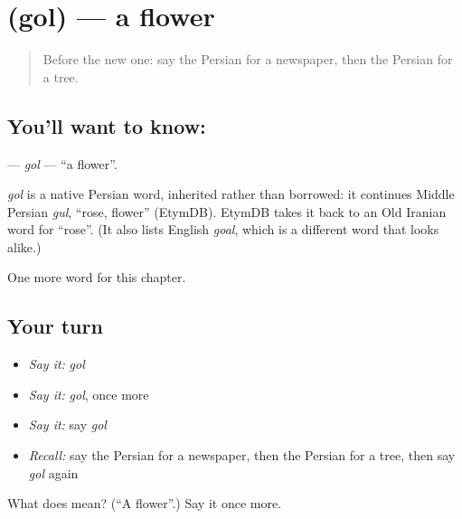 \section[\texorpdfstring{\fa{گل} (gol)}{گل (gol)}]{ (gol) — a flower}

\label{lesson:FA-C51-gol}



\begin{quote}
Before the new one: say the Persian for a newspaper, then the Persian for a tree.
\end{quote}

\subsection*{You'll want to know: }
\textbf{} — \emph{gol} — \textquotedblleft{}a flower\textquotedblright{}.

\begin{cousinweb}
\emph{gol} is a native Persian word, inherited rather than borrowed: it continues Middle Persian \emph{gul}, \textquotedblleft{}rose, flower\textquotedblright{} (EtymDB). EtymDB takes it back to an Old Iranian word for \textquotedblleft{}rose\textquotedblright{}. (It also lists English \emph{goal}, which is a different word that looks alike.)
\end{cousinweb}

\begin{grammarlens}[title={What you've built}]
One more word for this chapter.
\end{grammarlens}

\subsection*{Your turn}
\begin{itemize}
\raggedright
  \item \emph{Say it:} \emph{gol}
  \item \emph{Say it:} \emph{gol}, once more
  \item \emph{Say it:} say \emph{gol}
  \item \emph{Recall:} say the Persian for a newspaper, then the Persian for a tree, then say \emph{gol} again
\end{itemize}

\begin{tcolorbox}[breakable,colback=teal!4,colframe=teal!35!black,title={Before you move on}]
What does  mean? (\textquotedblleft{}A flower\textquotedblright{}.) Say it once more.
\end{tcolorbox}
